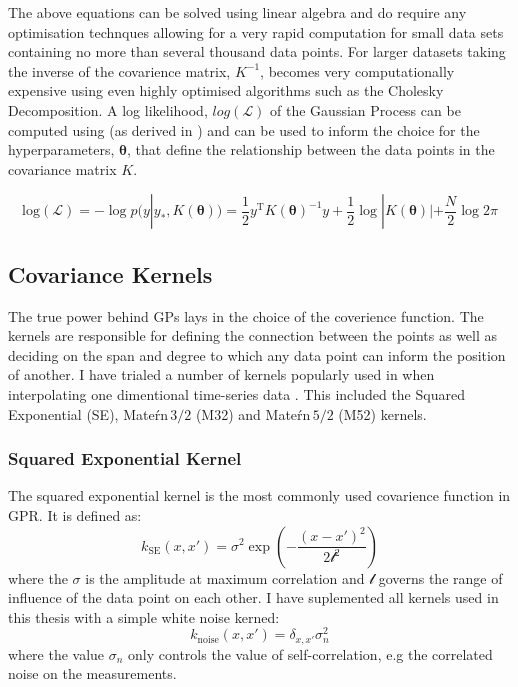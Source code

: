 The above equations can be solved using linear algebra and do require any optimisation technques allowing for a very rapid computation for small data sets containing no more than several thousand data points. For larger datasets taking the inverse of the covarience matrix, $K^{-1}$, becomes very computationally expensive using even highly optimised algorithms such as the Cholesky Decomposition. A log likelihood, $log(\mathcal{L})$ of the Gaussian Process can be computed using  (as derived in \citet{Rasmussen2006}) and can be used to inform the choice for the hyperparameters, $\mathbf{\theta}$, that define the relationship between the data points in the covariance matrix $K$.

\begin{equation} \label{eg:logGP}
\mathrm{log(\mathcal{L})} = - \log p(y|y_*, K(\mathbf{\theta})) = \frac{1}{2} y^{\mathrm{T}} K(\mathbf{\theta})^{-1} y + \frac{1}{2} \log |K(\mathbf{\theta})| + \frac{N}{2} \log 2 \pi
\end{equation}

\subsection{Covariance Kernels} \label{sec:GPkernels}
The true power behind GPs lays in the choice of the coverience function. The kernels are responsible for defining the connection between the points as well as deciding on the span and degree to which any data point can inform the position of another. I have trialed a number of kernels popularly used in when interpolating one dimentional time-series data \citep{Rasmussen2006}. This included the Squared Exponential (SE), Mate\'rn\,$3/2$ (M32) and Mate\'rn\,$5/2$ (M52) kernels.

\subsubsection{Squared Exponential Kernel}
The squared exponential kernel is the most commonly used covarience function in GPR. It is defined as:
\begin{equation}
  k_{\textrm{SE}}(x,x') = \sigma^2 \exp\left(-\frac{(x - x')^2}{2\mathcal{l}^2}\right)
\end{equation}
\noindent where the $\sigma$ is the amplitude at maximum correlation and $\mathcal{l}$ governs the range of influence of the data point on each other. I have suplemented all kernels used in this thesis with a simple white noise kerned:
\begin{equation}
  k_{\textrm{noise}}(x,x') = \delta_{x,x'}\sigma_n^2
\end{equation}
\noindent where the value $\sigma_n$ only controls the value of self-correlation, e.g the correlated noise on the measurements.

